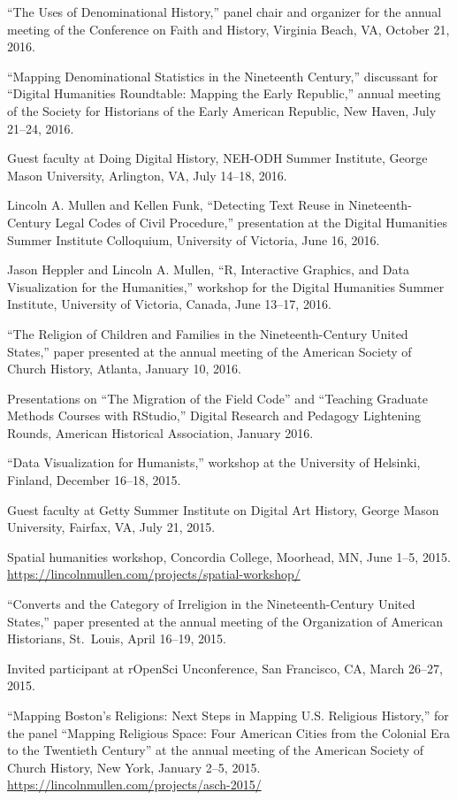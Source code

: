 \documentclass[11pt]{article}
\begin{document}
``The Uses of Denominational History,'' panel chair and organizer for the annual meeting of the Conference on Faith and History, Virginia Beach, VA, October 21, 2016.

``Mapping Denominational Statistics in the Nineteenth Century,'' discussant 
for ``Digital Humanities Roundtable: Mapping the Early Republic,'' annual 
meeting of the Society for Historians of the Early American Republic, New 
Haven, July 21--24, 2016.

Guest faculty at Doing Digital History, NEH-ODH Summer Institute, George 
Mason University, Arlington, VA, July 14--18, 2016.

Lincoln A. Mullen and Kellen Funk, ``Detecting Text Reuse in Nineteenth-Century 
Legal Codes of Civil Procedure,'' presentation at the Digital Humanities 
Summer Institute Colloquium, University of Victoria, June 16, 2016.

Jason Heppler and Lincoln A. Mullen, ``R, Interactive Graphics, and Data 
Visualization for the Humanities,'' workshop for the Digital Humanities Summer 
Institute, University of Victoria, Canada, June 13--17, 2016.  

``The Religion of Children and Families in the Nineteenth-Century United 
States,'' paper presented at the annual meeting of the American Society of 
Church History, Atlanta, January 10, 2016.

Presentations on ``The Migration of the Field Code'' and ``Teaching 
Graduate Methods Courses with RStudio,'' Digital Research and Pedagogy 
Lightening Rounds, American Historical Association, January 2016.

``Data Visualization for Humanists,'' workshop at the University of Helsinki, 
Finland, December 16--18, 2015. 

Guest faculty at Getty Summer Institute on 
Digital Art History, George Mason University, Fairfax, VA, July 21, 2015.

Spatial humanities workshop, Concordia College, Moorhead, MN, June 1--5, 2015.  
\url{https://lincolnmullen.com/projects/spatial-workshop/}

``Converts and the Category of Irreligion in the Nineteenth-Century
United States,'' paper presented at the annual meeting of the
Organization of American Historians, St.~Louis, April 16--19, 2015.

Invited participant at rOpenSci Unconference, San Francisco, CA, March 26--27, 2015.

``Mapping Boston's Religions: Next Steps in Mapping U.S. Religious History,'' 
for the panel ``Mapping Religious Space: Four American Cities from the 
Colonial Era to the Twentieth Century'' at the annual meeting of the American 
Society of Church History, New York, January 2--5, 2015.  
\url{https://lincolnmullen.com/projects/asch-2015/}
\end{document}
